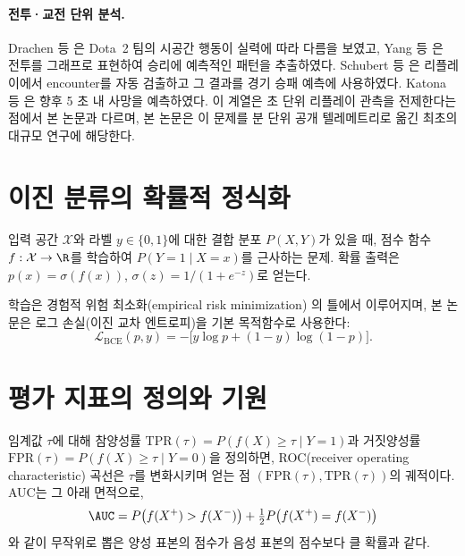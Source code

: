 \paragraph{전투·교전 단위 분석.} Drachen 등 \cite{drachen2014skill}은 Dota~2 팀의 시공간 행동이 실력에 따라 다름을 보였고, Yang 등 \cite{yang2014identifying}은 전투를 그래프로 표현하여 승리에 예측적인 패턴을 추출하였다. Schubert 등 \cite{schubert2016esports}은 리플레이에서 encounter를 자동 검출하고 그 결과를 경기 승패 예측에 사용하였다. Katona 등 \cite{katona2019time}은 향후 5 초 내 사망을 예측하였다. 이 계열은 초 단위 리플레이 관측을 전제한다는 점에서 본 논문과 다르며, 본 논문은 이 문제를 분 단위 공개 텔레메트리로 옮긴 최초의 대규모 연구에 해당한다.

\section{이진 분류의 확률적 정식화}
\label{sec:bg-classification}

\begin{definition}[이진 분류 문제]
입력 공간 $\mathcal{X}$와 라벨 $y \in \{0,1\}$에 대한 결합 분포 $P(X, Y)$가 있을 때, 점수 함수 $f: \mathcal{X} \to \R$를 학습하여 $P(Y=1 \mid X=x)$를 근사하는 문제. 확률 출력은 $p(x) = \sigma(f(x))$, $\sigma(z) = 1/(1+e^{-z})$로 얻는다.
\end{definition}

학습은 경험적 위험 최소화(empirical risk minimization) \cite{vapnik1998statistical}의 틀에서 이루어지며, 본 논문은 로그 손실(이진 교차 엔트로피)을 기본 목적함수로 사용한다:
\begin{equation}
  \mathcal{L}_{\mathrm{BCE}}(p, y) = -\big[y \log p + (1-y)\log(1-p)\big].
  \label{eq:bce}
\end{equation}

\section{평가 지표의 정의와 기원}
\label{sec:bg-metrics}

\begin{definition}
임계값 $\tau$에 대해 참양성률 $\mathrm{TPR}(\tau)=P(f(X)\ge\tau \mid Y=1)$과 거짓양성률 $\mathrm{FPR}(\tau)=P(f(X)\ge\tau \mid Y=0)$을 정의하면, ROC(receiver operating characteristic) 곡선은 $\tau$를 변화시키며 얻는 점 $(\mathrm{FPR}(\tau), \mathrm{TPR}(\tau))$의 궤적이다. AUC는 그 아래 면적으로,
\begin{equation}
  \AUC = P\big(f(X^{+}) > f(X^{-})\big) + \tfrac12 P\big(f(X^{+}) = f(X^{-})\big)
  \label{eq:auc}
\end{equation}
와 같이 무작위로 뽑은 양성 표본의 점수가 음성 표본의 점수보다 클 확률과 같다.
\end{definition}

